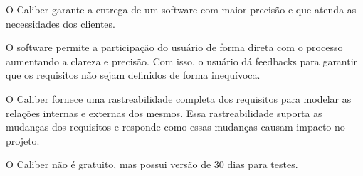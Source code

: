 O Caliber garante a entrega de um software com maior precisão e que atenda as necessidades dos clientes.

O software permite a participação do usuário de forma direta com o processo aumentando a clareza e precisão. Com isso, o usuário dá feedbacks para garantir que os requisitos não sejam definidos de forma inequívoca.

O Caliber fornece uma rastreabilidade completa dos requisitos para modelar as relações internas e externas dos mesmos.  Essa rastreabilidade suporta as mudanças dos requisitos  e responde como essas mudanças causam impacto no projeto.

O Caliber não é gratuito, mas possui versão de 30 dias para testes.



